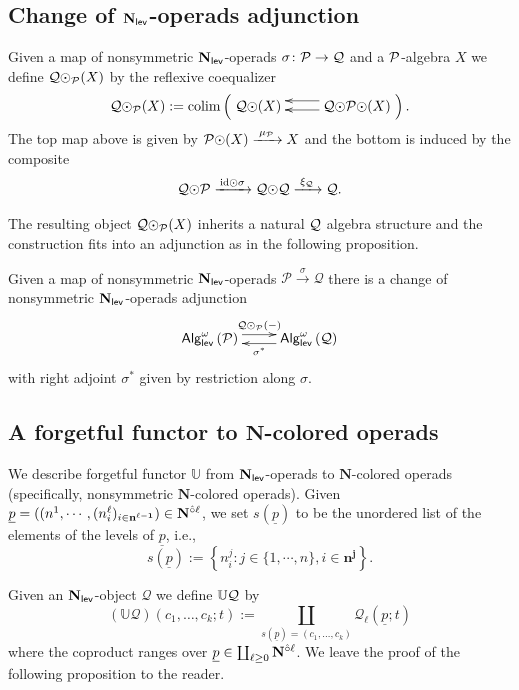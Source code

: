\subsection{Change of $\mathbf{N}_{\mathsf{lev}}$-operads adjunction}
Given a map of nonsymmetric $\mathbf{N}_{\mathsf{lev}}$-operads $\sigma\colon \mathcal{P}\to \mathcal{Q}$ and a $\mathcal{P}$-algebra $X$ we define $\mathcal{Q} {\odot}_{\mathcal{P}}(X)$ by the reflexive coequalizer \begin{equation*}
\label{circ-dot-over}
    \Cal{Q}\circdot_{\Cal{P}}(X):= \colim \left( \xymatrix{
    \Cal{Q}\circdot  (X) & \ar@<-1ex>[l] \ar@<.5ex>[l]  \Cal{Q}\circdot\Cal{P}\circdot (X) }\right).
\end{equation*}
The top map above is given by $\mathcal{P}{\odot} (X)\xrightarrow{\;\mu_{\mathcal{P}}\;} X$ and the bottom is induced by the composite \[\mathcal{Q}{\odot} \mathcal{P}\xrightarrow{\,\mathrm{id} {\odot} \sigma\,} \mathcal{Q}{\odot} \mathcal{Q}\xrightarrow{\;\xi_{\mathcal{Q}}\;} \mathcal{Q}.\] 

The resulting object $\mathcal{Q}{\odot}_{\mathcal{P}}(X)$ inherits a natural $\mathcal{Q}$ algebra structure and the construction fits into an adjunction as in the following proposition.

\begin{proposition} 
Given a map of nonsymmetric $\mathbf{N}_{\mathsf{lev}}$-operads $\mathcal{P}\xrightarrow{\; \sigma \;}\mathcal{Q}$ there is a change of nonsymmetric $\mathbf{N}_{\mathsf{lev}}$-operads adjunction \begin{equation*} \xymatrix{
    \AlgN{P} \ar@<.75 ex>[r] ^{\Cal{Q}\circdot_{\Cal{P}}(-)} &
    \AlgN{Q} \ar@<.75ex>[l]^{\sigma^*} }
\end{equation*}
with right adjoint $\sigma^*$ given by restriction along $\sigma$. 
\end{proposition}

\subsection{A forgetful functor to $\mathbf{N}$-colored operads} \label{N_l-is-N}  We describe forgetful functor $\mathbb{U}$ from $\mathbf{N}_{\mathsf{lev}}$-operads to $\mathbf{N}$-colored operads (specifically, nonsymmetric $\mathbf{N}$-colored operads). Given $\underline{p}=((n^1,\cdots, (n^{\ell}_i)_{i\in \mathbf{n^{\ell-1}}} )\in\mathbf{N}^{\hat{\circ}\ell}$, we set $s(\underline{p})$ to be the unordered list of the elements of the levels of $\underline{p}$, i.e., \[s(\underline{p}):=\left\{n^j_i: j\in\{1,\cdots,n\}, i\in \mathbf{n^j} \right\}. \] 

Given an $\mathbf{N}_{\mathsf{lev}}$-object $\mathcal{Q}$ we define $\mathbb{U}\mathcal{Q}$ by \begin{equation} 
    (\mathbb{U}\mathcal{Q})(c_1,\dots,c_k;t):=\coprod_{s(\underline{p})=(c_1,\dots,c_k)} \mathcal{Q}_{\ell}(\underline{p};t)
\end{equation}
where the coproduct ranges over $\underline{p}\in \coprod_{\ell \geq 0} \mathbf{N}^{\hat{\circ}\ell}$. We leave the proof of the following proposition to the reader.

